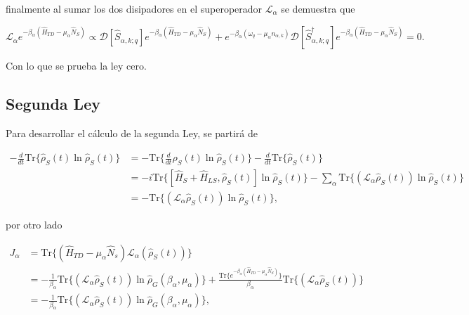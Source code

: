 \begin{appendixs}
finalmente al sumar los dos disipadores en el superoperador $\mathcal{L}_{\alpha}$ se demuestra que

\begin{equation*}
    \mathcal{L}_{\alpha}e^{-\beta_{\alpha}(\hat{H}_{TD} - \mu_{\alpha}\hat{N}_{S})} \propto  \mathcal{D}[\hat{S}_{\alpha,k;q}]e^{-\beta_{\alpha}(\hat{H}_{TD} - \mu_{\alpha}\hat{N}_{S})} + e^{-\beta_{\alpha}(\omega_{q} - \mu_{\alpha}n_{\alpha,k})}\mathcal{D}[\hat{S}^{\dagger}_{\alpha,k;q}]e^{-\beta_{\alpha}(\hat{H}_{TD} - \mu_{\alpha}\hat{N}_{S})} = 0.
\end{equation*}

Con lo que se prueba la ley cero.

\newpage


\subsection{Segunda Ley}
Para desarrollar el cálculo de la segunda Ley, se partirá de

\begin{align*}
    - \frac{d}{dt}\text{Tr}\{ \hat{\rho}_{S}(t)\ln \hat{\rho}_{S}(t) \} & =  -\text{Tr}\Big\{ \frac{d}{dt}\hat{\rho}_{S}(t)\ln \hat{\rho}_{S}(t) \Big\} - \frac{d}{dt}\text{Tr}\{\hat{\rho}_{S}(t) \}\\
  & = - i \text{Tr}\{[\hat{H}_{S}+\hat{H}_{LS},\hat{\rho}_{S}(t)]\ln \hat{\rho}_{S}(t)  \} - \sum_{\alpha} \text{Tr}\{(\mathcal{L}_{\alpha}\hat{\rho}_{S}(t)) \ln \hat{\rho}_{S}(t) \}  \\
  & = -\text{Tr}\{(\mathcal{L}_{\alpha}\hat{\rho}_{S}(t)) \ln \hat{\rho}_{S}(t) \},
\end{align*}

por otro lado

\begin{align*}
    J_{\alpha} & = \text{Tr}\{ (\hat{H}_{TD} - \mu_{\alpha}\hat{N}_{s})\mathcal{L}_{\alpha}(\hat{\rho}_{S}(t)) \} \\
    & = -\frac{1}{\beta_{\alpha}} \text{Tr}\{(\mathcal{L}_{\alpha}\hat{\rho}_{S}(t)) \ln \hat{\rho}_{G}(\beta_{\alpha},\mu_{\alpha})  \} + \frac{\text{Tr}\{e^{-\beta_{\alpha}(\hat{H}_{TD} - \mu_{\alpha}\hat{N}_{S})} \} }{\beta_{\alpha}} \text{Tr}\{(\mathcal{L}_{\alpha}\hat{\rho}_{S}(t)) \} \\
    & = -\frac{1}{\beta_{\alpha}} \text{Tr}\{(\mathcal{L}_{\alpha}\hat{\rho}_{S}(t))\ln \hat{\rho}_{G}(\beta_{\alpha},\mu_{\alpha})  \},
\end{align*}


\end{appendixs}
